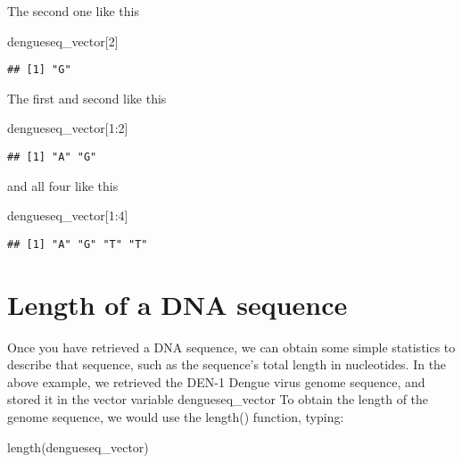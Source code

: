 \documentclass[
]{book}
\newenvironment{Shaded}{\begin{snugshade}}{\end{snugshade}}
\newcommand{\DecValTok}[1]{\textcolor[rgb]{0.00,0.00,0.81}{#1}}
\newcommand{\FunctionTok}[1]{\textcolor[rgb]{0.00,0.00,0.00}{#1}}
\newcommand{\NormalTok}[1]{#1}
\newcommand{\SpecialCharTok}[1]{\textcolor[rgb]{0.00,0.00,0.00}{#1}}
\begin{document}
The second one like this

\begin{Shaded}
\begin{Highlighting}[]
\NormalTok{dengueseq\_vector[}\DecValTok{2}\NormalTok{]}
\end{Highlighting}
\end{Shaded}

\begin{verbatim}
## [1] "G"
\end{verbatim}

The first and second like this

\begin{Shaded}
\begin{Highlighting}[]
\NormalTok{dengueseq\_vector[}\DecValTok{1}\SpecialCharTok{:}\DecValTok{2}\NormalTok{]}
\end{Highlighting}
\end{Shaded}

\begin{verbatim}
## [1] "A" "G"
\end{verbatim}

and all four like this

\begin{Shaded}
\begin{Highlighting}[]
\NormalTok{dengueseq\_vector[}\DecValTok{1}\SpecialCharTok{:}\DecValTok{4}\NormalTok{]}
\end{Highlighting}
\end{Shaded}

\begin{verbatim}
## [1] "A" "G" "T" "T"
\end{verbatim}

\hypertarget{length-of-a-dna-sequence}{%
\section{Length of a DNA sequence}\label{length-of-a-dna-sequence}}

Once you have retrieved a DNA sequence, we can obtain some simple statistics to describe that sequence, such as the sequence's total length in nucleotides. In the above example, we retrieved the DEN-1 Dengue virus genome sequence, and stored it in the vector variable dengueseq\_vector To obtain the length of the genome sequence, we would use the length() function, typing:

\begin{Shaded}
\begin{Highlighting}[]
\FunctionTok{length}\NormalTok{(dengueseq\_vector)}
\end{Highlighting}
\end{Shaded}
\end{document}
